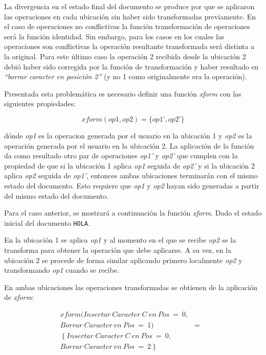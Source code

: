 \documentclass[12pt,a4paper]{article}
\begin{document}
	La divergencia en el estado final del documento se produce por que se aplicaron las operaciones en cada 
	ubicación sin haber sido transformadas previamente. En el caso de operaciones no conflictivas la función
	transformación de operaciones será la función  identidad. Sin embargo, para los casos en los cuales las
	operaciones son conflictivas la operación resultante transformada será distinta a la original.
	Para este último caso la operación 2 recibida desde la ubicación 2 debió haber sido corregida por la función
	de transformación y haber resultado en \textit{“borrar caracter en posición 2”} (y no 1 como originalmente
	era la operación).
	
	Presentada esta problemática es necesario definir una función \textit{xform} con las siguientes propiedades:
	
	\begin{equation} xform(op1,op2) = \lbrace op1’,op2’ \rbrace
	\end{equation}

	dónde \textit{op1} es la operacion generada por el usuario en la ubicación 1 y \textit{op2} es la operación
	generada por el usuario en la ubicación 2. La aplicación de la función da como resultado otro par de operaciones
	\textit{op1’} y \textit{op2’} que cumplen con la propiedad de que si la ubicación 1 aplica \textit{op1} seguida
	de  \textit{op2’}  y si la ubicación 2 aplica \textit{op2} seguida de \textit{op1’}, entonces ambas
	ubicaciones terminarán con el mismo estado del documento.
	Esto requiere que \textit{op1} y \textit{op2} hayan sido generadas a partir del mismo estado del documento.

	Para el caso anterior, se mostrará a continuación la función \textit{xform}.
	Dado el estado inicial del documento \texttt{HOLA}.

	En la ubicación 1 se aplica \textit{op1} y al momento en el que se recibe \textit{op2} se la transforma 
	para obtener la operación que debe aplicarse. A su vez, en la ubicación 2 se procede de forma similar
	aplicando primero localmente \textit{op2} y transformando \textit{op1} cuando se recibe.

	En ambas ubicaciones las operaciones transformadas se obtienen de la aplicación de \textit{xform}:
	
\begin{eqnarray*}
  xform(Insertar\ Caracter\ C\ en\ Pos\ =\ 0, \\
  Borrar\ Caracter\ en\ Pos\ =\ 1) & = & \\ 
  \left\lbrace Insertar\ Caracter\ C\ en\ Pos\ =\ 0, \\
  Borrar\ Caracter\ en\ Pos\ =\ 2\ \rbrace  
\end{eqnarray*}
\end{document}
